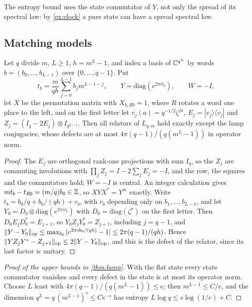 The entropy bound uses the state commutator of $Y$, not only the spread of its spectral law: by \cref{ex:clock} a pure
state can have a spread spectral law.

\subsection{Matching models}\label{sec:rates-models}

\begin{example}\label{ex:fourier-lamps}
Let $q$ divide $m$, $L\ge1$, $h=m^L-1$, and index a basis of $\mathbb C^{q^L}$ by words $b=(b_0,\dots,b_{L-1})$ over
$\{0,\dots,q-1\}$. Put
\[
t_b=\frac{m}{qh}\sum_{j=0}^{L-1}b_jm^{L-1-j},\qquad Y=\mathrm{diag}(e^{2\pi it_b}),\qquad W=-I,
\]
let $X$ be the permutation matrix with $X_{b,Rb}=1$, where $R$ rotates a word one place to the left, and on the first letter
let $v_j(a)=q^{-1/2}\zeta^{ja}$, $E_j=|v_j\rangle\langle v_j|$ and $Z_j=(I_q-2E_j)\otimes I_{q^{L-1}}$. Then all relators of
$L_{q,m}$ hold exactly except the lamp conjugacies, whose defects are at most $4\pi(q-1)/(q(m^L-1))$ in operator norm.
\end{example}

\begin{proof}
The $E_j$ are orthogonal rank-one projections with sum $I_q$, so the $Z_j$ are commuting involutions with
$\prod_jZ_j=I-2\sum_jE_j=-I$, and the row, the squares and the commutators hold; $W=-I$ is central. An integer calculation
gives $mt_b-t_{Rb}=(m/q)b_0\in\mathbb Z$, so $XYX^*=Y^m$ exactly. Write $t_b=b_0/q+b_0/(qh)+r_b$, with $r_b$ depending only on
$b_1,\dots,b_{L-1}$, and let $Y_0=D_0\otimes\mathrm{diag}(e^{2\pi ir_b})$ with $D_0=\mathrm{diag}(\zeta^{a})$ on the first letter. Then
$D_0E_jD_0^*=E_{j+1}$, so $Y_0Z_jY_0^*=Z_{j+1}$, including $j=q-1$, and $\lVert Y-Y_0\rVert_{\mathrm{op}}\le\max_{b_0}|e^{2\pi ib_0/(qh)}-1|\le
2\pi(q-1)/(qh)$. Hence $\lVert YZ_jY^*-Z_{j+1}\rVert_{\mathrm{op}}\le2\lVert Y-Y_0\rVert_{\mathrm{op}}$, and this is the defect of the relator, since its last factor is
unitary.
\end{proof}

\begin{proof}[Proof of the upper bounds in \cref{thm:lamp}]
With the flat state every state commutator vanishes and every defect in the state is at most its operator norm. Choose
$L$ least with $4\pi(q-1)/(q(m^L-1))\le e$; then $m^{L-1}\le C/e$, and the dimension $q^L=q\,(m^{L-1})^s\le Ce^{-s}$ has
entropy $L\log q\le s\log(1/e)+C$.
\end{proof}

